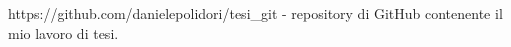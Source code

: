 \documentclass[12pt,a4paper,openright,twoside]{report}
\begin{document}


\begin{thebibliography}{90}		%


 https://github.com/danielepolidori/tesi_git - repository di GitHub contenente il mio lavoro di tesi.

\end{thebibliography}

\clearpage{\pagestyle{empty}\cleardoublepage}	%




\end{document}
